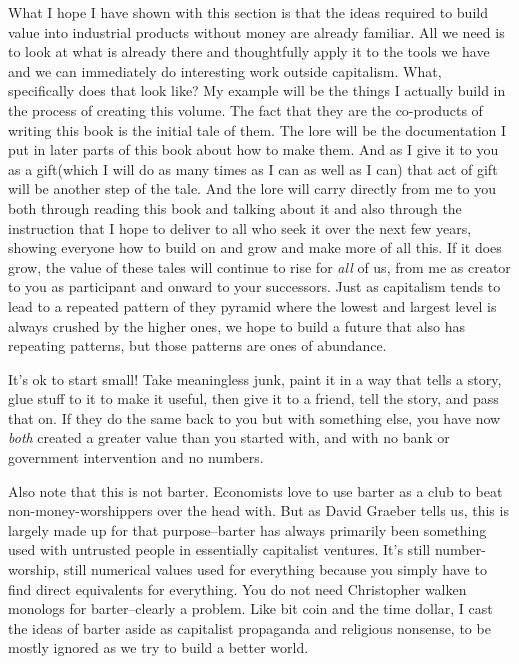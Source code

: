 What I hope I have shown with this section is that the ideas required to
build value into industrial products without money are already familiar.
All we need is to look at what is already there and thoughtfully apply
it to the tools we have and we can immediately do interesting work
outside capitalism. What, specifically does that look like? My example
will be the things I actually build in the process of creating this
volume. The fact that they are the co-products of writing this book is
the initial tale of them. The lore will be the documentation I put in
later parts of this book about how to make them. And as I give it to you
as a gift(which I will do as many times as I can as well as I can) that
act of gift will be another step of the tale. And the lore will carry
directly from me to you both through reading this book and talking about
it and also through the instruction that I hope to deliver to all who
seek it over the next few years, showing everyone how to build on and
grow and make more of all this. If it does grow, the value of these
tales will continue to rise for \emph{all} of us, from me as creator to
you as participant and onward to your successors. Just as capitalism
tends to lead to a repeated pattern of they pyramid where the lowest and
largest level is always crushed by the higher ones, we hope to build a
future that also has repeating patterns, but those patterns are ones of
abundance.

It's ok to start small! Take meaningless junk, paint it in a way that
tells a story, glue stuff to it to make it useful, then give it to a
friend, tell the story, and pass that on. If they do the same back to
you but with something else, you have now \emph{both} created a greater
value than you started with, and with no bank or government intervention
and no numbers.

Also note that this is not barter. Economists love to use barter as a
club to beat non-money-worshippers over the head with. But as David
Graeber tells us, this is largely made up for that purpose--barter has
always primarily been something used with untrusted people in
essentially capitalist ventures. It's still number-worship, still
numerical values used for everything because you simply have to find
direct equivalents for everything. You do not need Christopher walken
monologs for barter--clearly a problem. Like bit coin and the time
dollar, I cast the ideas of barter aside as capitalist propaganda and
religious nonsense, to be mostly ignored as we try to build a better
world.

